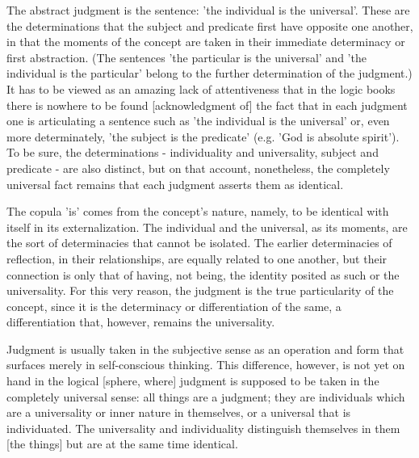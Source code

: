 The abstract judgment is the sentence: 'the individual is the universal'.
These are the determinations that the subject and predicate
first have opposite one another, in that the moments of the concept are
taken in their immediate determinacy or first abstraction.
(The sentences 'the particular is the universal' and
'the individual is the particular' belong to
the further determination of the judgment.)
It has to be viewed as an amazing lack of attentiveness that
in the logic books there is nowhere to be found [acknowledgment of]
the fact that in each judgment one is articulating a sentence such as
'the individual is the universal' or, even more determinately,
'the subject is the predicate' (e.g. 'God is absolute spirit').
To be sure, the determinations - individuality and universality,
subject and predicate - are also distinct, but on that account,
nonetheless, the completely universal fact remains that
each judgment asserts them as identical.

The copula 'is' comes from the concept's nature, namely,
to be identical with itself in its externalization.
The individual and the universal, as its moments,
are the sort of determinacies that cannot be isolated.
The earlier determinacies of reflection, in their relationships,
are equally related to one another,
but their connection is only that of having, not being,
the identity posited as such or the universality.
For this very reason, the judgment is
the true particularity of the concept,
since it is the determinacy or differentiation of the same,
a differentiation that, however, remains the universality.

Judgment is usually taken in the subjective sense as an operation and form
that surfaces merely in self-conscious thinking.
This difference, however, is not yet on hand in the logical [sphere, where]
judgment is supposed to be taken in the completely universal sense:
all things are a judgment;
they are individuals which are a universality or inner nature in themselves,
or a universal that is individuated. The universality and individuality
distinguish themselves in them [the things] but are at the same time identical.

